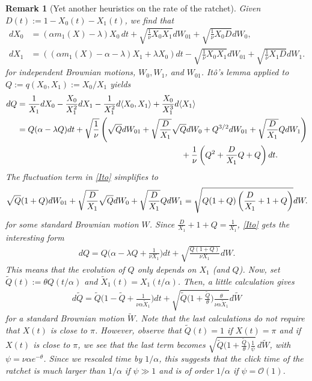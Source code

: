 \documentclass{imsart}
\theoremstyle{plain}
\newtheorem{remark}[theorem]{Remark}
\theoremstyle{definition}
\begin{document}
\begin{remark}[Yet another heuristics on the rate of the ratchet]
Given $D(t):= 1-X_0(t)-X_1(t)$, we find that
\begin{align*}
dX_0 & = (\alpha m_1(X)-\lambda)X_0\, dt + \sqrt{\frac 1{\nu} X_0X_1}dW_{01} + \sqrt{\frac 1{\nu} X_0D}dW_{0},\\
dX_1 & = \left((\alpha m_1(X) - \alpha-\lambda)X_1+\lambda X_0\right)dt - \sqrt{\frac 1{\nu} X_0X_1}dW_{01} + \sqrt{\frac 1{\nu} X_1D}dW_{1}.
\end{align*}
for independent Brownian motions, $W_0, W_1$, and $W_{01}$.  It\^o's lemma applied to $Q:=q(X_0,X_1):= X_0/X_1$ yields
\begin{align} \label{Ito}dQ & = \frac{1}{X_1}dX_0 - \frac{X_0}{X_1^2}dX_1 - \frac{1}{X_1^2} d\langle X_0, X_1\rangle +  \frac{X_0}{X_1^3} d\langle X_1\rangle \\
& = \notag 
Q(\alpha -\lambda Q)dt
 +\sqrt{\frac 1{\nu}} \left(\sqrt Q dW_{01} + \sqrt{\frac D{X_1}}\sqrt
  Q dW_0 + Q^{3/2}dW_{01} + \sqrt{\frac D{X_1}} Q dW_1\right) \\
\notag & \qquad \qquad \qquad \qquad \qquad \qquad \qquad \qquad \qquad \qquad + \frac 1{\nu} \left(Q^2+ \frac D{X_1}Q+Q\right)dt. 
\end{align}
The fluctuation term in \eqref{Ito} simplifies to
  \begin{align}\notag
    \sqrt Q(1+Q)dW_{01}+\sqrt{\frac D{X_1}}\sqrt Q dW_0+ \sqrt{\frac
      D{X_1}} Q dW_1=\sqrt{Q(1+Q)\left(\frac D{X_1} + 1+Q\right)} dW.
\end{align}
for some standard Brownian motion $W$. Since $\frac D{X_1} + 1+Q = \frac 1{X_1}$, \eqref{Ito} gets the interesting form
\begin{align}\label{dynQ}
dQ = Q\Big(\alpha-\lambda Q + \frac1{\nu X_1}\Big)dt + \sqrt{\frac {Q(1+Q)}{\nu X_1}} dW.
\end{align}
This means that the evolution of $Q$ only depends on $X_1$ (and $Q$). 
Now, set $\widetilde Q(t) := \theta Q(t/\alpha)$ and $\widetilde X_1(t) = X_1(t / \alpha)$. Then, a little  calculation gives
\begin{align}\label{sdynQ}
d\widetilde Q = \widetilde Q\Big(1-\widetilde Q + \frac1{\nu \alpha \widetilde X_1}\Big)dt +  \sqrt{\widetilde Q   \Big(1+\frac{\widetilde Q}{\theta}\Big) \frac {\theta}{\nu \alpha \widetilde X_1}}d\widetilde W
\end{align}
for a standard Brownian motion $\widetilde W$. Note that the last calculations do not require that $X(t)$ is close to $\pi$. However, observe that $\widetilde Q(t)=1$ if $X(t) = \pi$ and if $X(t)$ is close to $ \pi$, we see that the last term becomes $\sqrt{\widetilde Q\Big(1 + \frac{\widetilde Q}{\theta}\Big)\frac{1}{\psi}}\, d\widetilde W$, with $\psi = \nu \alpha e^{-\theta}$. Since we rescaled time by $1/\alpha$, this suggests that the click time of the ratchet is much larger than $1/\alpha$ if $\psi \gg 1$ and is of order $1/\alpha$ if $\psi = \mathcal O(1)$.
\end{remark}
\end{document}
